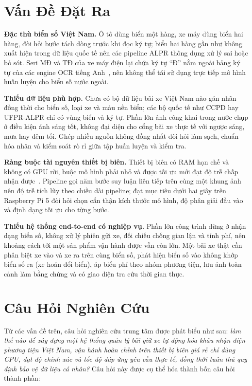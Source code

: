 \section{Vấn Đề Đặt Ra}

\textbf{Đặc thù biển số Việt Nam.}
Ô tô dùng biển một hàng, xe máy dùng biển hai hàng, đòi hỏi bước tách dòng trước khi
đọc ký tự; biển hai hàng gần như không xuất hiện trong dữ liệu quốc tế nên các pipeline
ALPR thông dụng xử lý sai hoặc bỏ sót. Seri MĐ và TĐ của xe máy điện lại chứa ký tự
``Đ'' nằm ngoài bảng ký tự của các engine OCR tiếng
Anh~\autocite{tran2025vietnamlpr,le2023motorcycleplate}, nên không thể tái sử dụng trực
tiếp mô hình huấn luyện cho biển số nước ngoài.

\textbf{Thiếu dữ liệu phù hợp.}
Chưa có bộ dữ liệu bãi xe Việt Nam nào gán nhãn đồng thời cho biển số, loại xe và màu
nền biển; các bộ quốc tế như CCPD hay UFPR-ALPR chỉ có vùng biển và ký tự. Phần lớn ảnh
công khai trong nước chụp ở điều kiện ánh sáng tốt, không đại diện cho cổng bãi xe thực
tế với ngược sáng, mưa hay đêm tối. Ghép nhiều nguồn không đồng nhất đòi hỏi làm sạch,
chuẩn hóa nhãn và kiểm soát rò rỉ giữa tập huấn luyện và kiểm tra.

\textbf{Ràng buộc tài nguyên thiết bị biên.}
Thiết bị biên có RAM hạn chế và không có GPU rời, buộc mô hình phải nhỏ và được tối ưu
mới đạt độ trễ chấp nhận được~\autocite{mdpi2026sbcbenchmark,sonnara2025lightedge}.
Pipeline gọi năm bước suy luận liên tiếp trên cùng một khung ảnh nên độ trễ tích lũy
theo chiều dài pipeline; đạt mục tiêu dưới hai giây trên Raspberry Pi 5 đòi hỏi chọn cẩn
thận kích thước mô hình, độ phân giải đầu vào và định dạng tối ưu cho từng bước.

\textbf{Thiếu hệ thống end-to-end có nghiệp vụ.}
Phần lớn công trình dừng ở nhận dạng biển số, không xử lý phiên gửi xe, đối chiếu chống
gian lận và tính phí, nên khoảng cách tới một sản phẩm vận hành được vẫn còn lớn. Một
bãi xe thật cần phân biệt xe vào và xe ra trên cùng biển số, phát hiện biển số vào không
khớp biển số ra (xe hoán đổi biển), áp biểu phí theo nhóm phương tiện, lưu ảnh toàn cảnh
làm bằng chứng và có giao diện tra cứu thời gian thực.

\section{Câu Hỏi Nghiên Cứu}
\label{sec:cauhoi}

Từ các vấn đề trên, câu hỏi nghiên cứu trung tâm được phát biểu như sau: \emph{làm thế
nào để xây dựng một hệ thống quản lý bãi giữ xe tự động hóa khâu nhận diện phương tiện
Việt Nam, vận hành hoàn chỉnh trên thiết bị biên giá rẻ chỉ dùng CPU, đạt độ chính xác
và tốc độ đáp ứng yêu cầu thực tế, đồng thời tuân thủ quy định bảo vệ dữ liệu cá nhân?}
Câu hỏi này được cụ thể hóa thành bốn câu hỏi thành phần:

